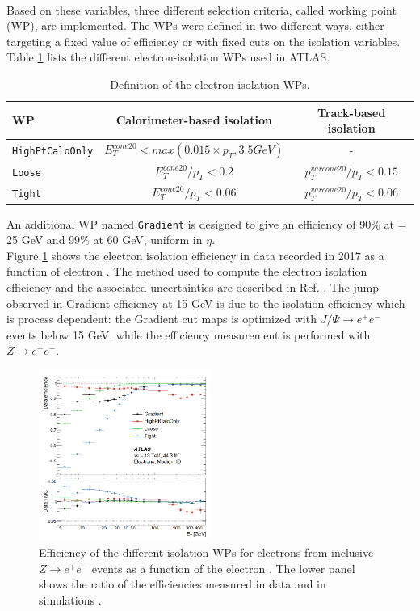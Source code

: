 \\
Based on these variables, three different selection criteria, called working point (WP), are implemented. The WPs were defined in two different ways, either targeting a fixed value of efficiency or with fixed cuts on the isolation variables. Table \ref{tab:chap2:Objects:Egamma:EIso:WPs} lists the different electron-isolation WPs used in ATLAS.
\begin{table}[htbp]
    \centering
    \begin{tabular}{lcc}
    \hline \hline
        WP & Calorimeter-based isolation & Track-based isolation \\ \hline 
        \texttt{HighPtCaloOnly} & $E^{cone20}_T < max(0.015\times p_T, 3.5 GeV)$ & - \\
        \texttt{Loose} & $E^{cone20}_T/p_T < 0.2$ & $p^{varcone20}_T/p_T < 0.15$ \\
        \texttt{Tight} & $E^{cone20}_T/p_T < 0.06$ & $p^{varcone20}_T/p_T < 0.06$ \\ \hline \hline
    \end{tabular}
    \caption{Definition of the electron isolation WPs.}
    \label{tab:chap2:Objects:Egamma:EIso:WPs}
\end{table}
An additional WP named \texttt{Gradient} is designed to give an efficiency of 90\% at \pT = 25 GeV and 99\% at 60 GeV, uniform in $\eta$.\\
Figure \ref{fig:chap2:Objects:Egamma:EIso:Eff} shows the electron isolation efficiency in data recorded in 2017 as a function of electron \eT \cite{Egamma_Perf_2017}. The method used to compute the electron isolation efficiency and the associated uncertainties are described in Ref. \cite{Electron_Reco_Id_Run1}. The jump observed in Gradient efficiency at 15 GeV is due to the isolation efficiency which is process dependent: the Gradient cut maps is optimized with $J/\Psi\rightarrow e^+e^-$ events below 15 GeV, while the efficiency measurement is performed with $Z\rightarrow e^+e^-$.
\begin{figure}[htbp]
    \centering
    \includegraphics[width=0.5\textwidth]{Ch2/Img/Electron_Iso_Eff.png}
    \caption{Efficiency of the different isolation WPs for electrons from inclusive $Z\rightarrow e^+e^-$ events as a function of the electron \eT. The lower panel shows the ratio of the efficiencies measured in data and in simulations \cite{Egamma_Perf_2017}.}
    \label{fig:chap2:Objects:Egamma:EIso:Eff}
\end{figure}

